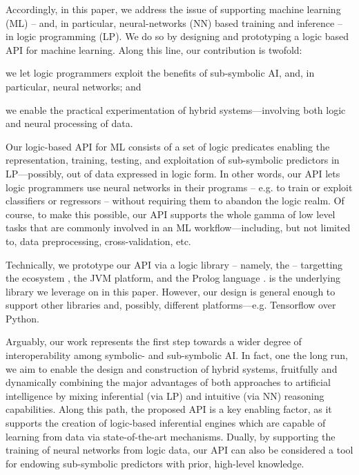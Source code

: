 \documentclass[runningheads]{llncs}
\begin{document}
Accordingly, in this paper, we address the issue of supporting machine learning (ML) -- and, in particular, neural-networks (NN) based training and inference -- in logic programming (LP).
%
We do so by designing and prototyping a logic based API for machine learning.
%
Along this line, our contribution is twofold:
%
\begin{inlinelist}
    \item we let logic programmers exploit the benefits of sub-symbolic AI, and, in particular, neural networks; and
    \item we enable the practical experimentation of hybrid systems---involving both logic and neural processing of data.
\end{inlinelist}

Our logic-based API for ML consists of a set of logic predicates enabling the representation, training, testing, and exploitation of sub-symbolic predictors in LP---possibly, out of data expressed in logic form.
%
In other words, our API lets logic programmers use neural networks in their programs -- e.g. to train or exploit classifiers or regressors -- without requiring them to abandon the logic realm.
%
Of course, to make this possible, our API supports the whole gamma of low level tasks that are commonly involved in an ML workflow---including, but not limited to, data preprocessing, cross-validation, etc.

Technically, we prototype our API via a logic library -- namely, the \mllib{} -- targetting the \twopkt{} ecosystem \cite{2p-kt}, the JVM platform, and the Prolog language \cite{prolog50years-tplp}.
%
\deeplearningforj{} \cite{DL4J} is the underlying library we leverage on in this paper.
%
However, our design is general enough to support other libraries and, possibly, different platforms---e.g. Tensorflow \cite{tensorflow2015-whitepaper} over Python.

Arguably, our work represents the first step towards a wider degree of interoperability among symbolic- and sub-symbolic AI.
%
In fact, one the long run, we aim to enable the design and construction of hybrid systems, fruitfully and dynamically combining the major advantages of both approaches to artificial intelligence by mixing inferential (via LP) and intuitive (via NN) reasoning capabilities.
%
Along this path, the proposed API is a key enabling factor, as it supports the creation of logic-based inferential engines which are capable of learning from data via state-of-the-art mechanisms.
%
Dually, by supporting the training of neural networks from logic data, our API can also be considered a tool for endowing sub-symbolic predictors with prior, high-level knowledge.
\end{document}
